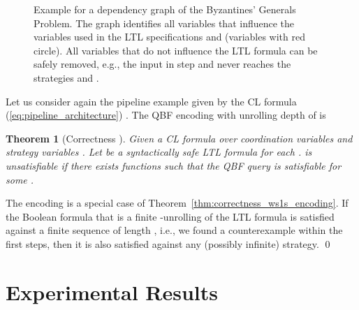 \documentclass{LMCS}
\theoremstyle{plain}\newtheorem{theorem}[thm]{Theorem}
\theoremstyle{plain}\newtheorem{lemma}[thm]{Lemma}
\theoremstyle{plain}\newtheorem{proposition}[thm]{Proposition}
\theoremstyle{plain}\newtheorem{corollary}[thm]{Corollary}
\theoremstyle{definition}\newtheorem{definition}{Definition}[section]
\begin{document}
\begin{figure}
{     \label{fig:qbf_encoding_optimization_dependency_graph_after}
  }\caption[]{Example for a dependency graph of the Byzantines' Generals Problem. The graph identifies all variables that influence the variables used in the LTL specifications  and  (variables with red circle). All variables that do not influence the LTL formula can be safely removed, e.g., the input  in step  and  never reaches the strategies  and .}
  \label{fig:qbf_encoding_optimization_dependency_graph}
\end{figure}

Let us consider again the pipeline example given by the CL formula (\ref{eq:pipeline_architecture}) .
The QBF encoding with unrolling depth of  is


\begin{theorem}[Correctness ] \label{thm:correctness_qbf_encoding}
  Given a CL formula  over coordination variables  and strategy variables .
  Let  be a syntactically safe LTL formula for each .
   is unsatisfiable if there exists functions  such that the QBF query  is satisfiable for some .
\end{theorem}
\proof
The encoding is a special case of Theorem~\ref{thm:correctness_ws1s_encoding}.
If the Boolean formula that is a finite -unrolling of the LTL formula is satisfied against a finite sequence of length , i.e., we found a counterexample within the first  steps, then it is also satisfied against any (possibly infinite) strategy.
\qed









\section{Experimental Results}
\end{document}
